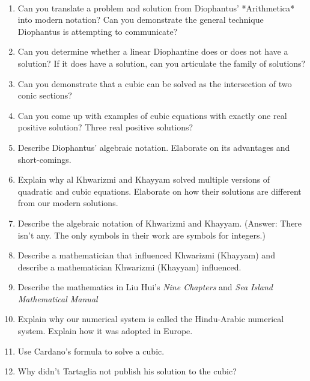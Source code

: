 \documentclass[11pt,fleqn]{article}
\begin{document}
\renewcommand{\headrulewidth}{0pt}
\newcommand{\blank}[1]{\rule{#1}{0.75pt}}
\newcommand{\bc}{\begin{center}}
\newcommand{\ec}{\end{center}}
\renewcommand{\d}{\displaystyle}

\vspace*{-0.7in}

\begin{center}
  \large
  \\
\end{center}

\begin{enumerate}
\item Can you translate a problem and solution from Diophantus' *Arithmetica* into modern notation? Can you demonstrate the general technique Diophantus is attempting to communicate?
\item Can you determine whether a linear Diophantine does or does not have a solution? If it does have a solution, can you articulate the family of solutions?
\item Can you demonstrate that a cubic can be solved as the intersection of two conic sections?
\item Can you come up with examples of cubic equations with exactly one real positive solution? Three real positive solutions?
\item Describe Diophantus' algebraic notation. Elaborate on its advantages and short-comings.
\item Explain why al Khwarizmi and Khayyam solved multiple versions of quadratic and cubic equations. Elaborate on how their solutions are different from our modern solutions.
\item Describe the algebraic notation of Khwarizmi and Khayyam. (Answer: There isn't any. The only symbols in their work are symbols for integers.)
\item Describe a mathematician that influenced Khwarizmi (Khayyam) and describe a mathematician Khwarizmi (Khayyam) influenced.
\item Describe the mathematics in Liu Hui's \textit{Nine Chapters} and \textit{Sea Island Mathematical Manual}
\item Explain why our numerical system is called the Hindu-Arabic numerical system. Explain how it was adopted in Europe.
\item Use Cardano's formula to solve a cubic.
\item Why didn't Tartaglia not publish his solution to the cubic?

\end{enumerate}
\end{document}
